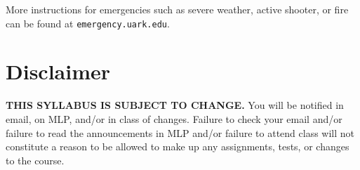 \documentclass[margin,line,pifont,palatino,courier]{res}
\begin{document}
\begin{resume}
More instructions for emergencies such as severe weather, active shooter, or fire can be found at \verb+emergency.uark.edu+.   

\section{\sc Disclaimer} {\bf THIS SYLLABUS IS SUBJECT TO CHANGE.} You will be notified in email, on MLP, and/or in class of changes. Failure to check your email and/or failure to read the announcements in MLP and/or failure to attend class will not constitute a reason to be allowed to make up any assignments, tests, or changes to the course.

\end{resume}
\end{document}
